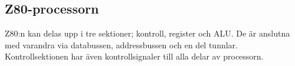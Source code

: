 \documentclass[main.tex]{subfiles}
\begin{document}
\subsection{Z80-processorn}
Z80:n kan delas upp i tre sektioner; kontroll, register och ALU. De är anslutna
med varandra via databussen, addressbussen och en del tunnlar.
Kontrollsektionen har även kontrollsignaler till alla delar av processorn.



\end{document}
